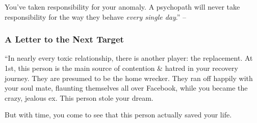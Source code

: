 \documentclass{article}
\numberwithin{equation}{section}
\begin{document}
You've taken responsibility for your anomaly. A psychopath will never take responsibility for the way they behave \textit{every single day}.'' -- \cite[pp. 142--145]{MacKenzie2015}

\subsubsection{A Letter to the Next Target}
``In nearly every toxic relationship, there is another player: the replacement. At 1st, this person is the main source of contention \& hatred in your recovery journey. They are presumed to be the home wrecker. They ran off happily with your soul mate, flaunting themselves all over Facebook, while you became the crazy, jealous ex. This person stole your dream.

But with time, you come to see that this person actually saved your life.
\end{document}
